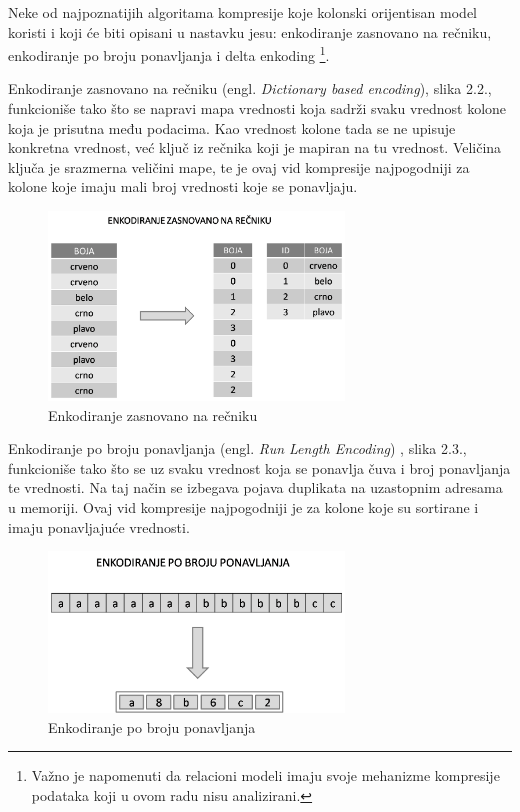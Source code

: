 \documentclass[12pt,oneside]{memoir}
\begin{document}
Neke od najpoznatijih algoritama kompresije koje kolonski orijentisan model koristi i koji će biti opisani u nastavku jesu: enkodiranje zasnovano na rečniku, enkodiranje po broju ponavljanja i delta enkoding \cite{ColumnarOptimizations}\footnote{Važno je napomenuti da relacioni modeli imaju svoje mehanizme kompresije podataka koji u ovom radu nisu analizirani.}.

Enkodiranje zasnovano na rečniku (engl. \textit{Dictionary based encoding}), slika 2.2., funkcioniše tako što se napravi mapa vrednosti koja sadrži svaku vrednost kolone koja je prisutna među podacima. Kao vrednost kolone tada se ne upisuje konkretna vrednost, već ključ iz rečnika koji je mapiran na tu vrednost. Veličina ključa je srazmerna veličini mape, te je ovaj vid kompresije najpogodniji za kolone koje imaju mali broj vrednosti koje se ponavljaju.

\begin{figure}[!ht]
  \centering
  \includegraphics[width=0.7\textwidth]{DictionaryEncoding.png}
  \caption{Enkodiranje zasnovano na rečniku}
  \label{fig:grafikon}
\end{figure}


Enkodiranje po broju ponavljanja  (engl. \textit{Run Length Encoding}) , slika 2.3., funkcioniše tako što se uz svaku vrednost koja se ponavlja čuva i broj ponavljanja te vrednosti. Na taj način se izbegava pojava duplikata na uzastopnim adresama u memoriji. Ovaj vid kompresije najpogodniji je za kolone koje su sortirane i imaju ponavljajuće vrednosti.

\begin{figure}[!ht]
  \centering
  \includegraphics[width=0.7\textwidth]{run-length-encoding.png}
  \caption{Enkodiranje po broju ponavljanja}
  \label{fig:grafikon}
\end{figure}
\end{document}
